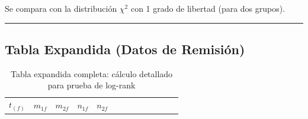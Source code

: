 \documentclass[
]{article}
\begin{document}
Se compara con la distribución \(\chi^2\) con 1 grado de libertad (para
dos grupos).

\begin{center}\rule{0.5\linewidth}{0.5pt}\end{center}

\subsection{Tabla Expandida (Datos de
Remisión)}\label{tabla-expandida-datos-de-remisiuxf3n}

\begin{longtable}[]{@{}
  >{\raggedright\arraybackslash}p{}
  >{\raggedleft\arraybackslash}p{}
  >{\raggedleft\arraybackslash}p{}
  >{\raggedright\arraybackslash}p{}
  >{\raggedright\arraybackslash}p{}
  >{\raggedright\arraybackslash}p{}
  >{\raggedright\arraybackslash}p{}
  >{\raggedleft\arraybackslash}p{}
  >{\raggedleft\arraybackslash}p{}
  >{\raggedright\arraybackslash}p{}
  >{\raggedright\arraybackslash}p{}
  >{\raggedleft\arraybackslash}p{}
  >{\raggedleft\arraybackslash}p{}@{}}
\caption{Tabla expandida completa: cálculo detallado para prueba de
log-rank}\tabularnewline
\toprule\noalign{}
\begin{minipage}[b]{\linewidth}\raggedright
\(t_{(f)}\)
\end{minipage} & \begin{minipage}[b]{\linewidth}\raggedleft
\(m_{1f}\)
\end{minipage} & \begin{minipage}[b]{\linewidth}\raggedleft
\(m_{2f}\)
\end{minipage} & \begin{minipage}[b]{\linewidth}\raggedright
\(n_{1f}\)
\end{minipage} & \begin{minipage}[b]{\linewidth}\raggedright
\(n_{2f}\)
\end{minipage} & \begin{minipage}[b]{\linewidth}\raggedright

\end{minipage}
\end{longtable}
\end{document}
